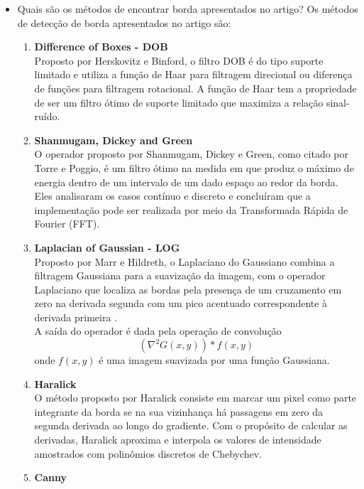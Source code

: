 \documentclass[12pt]{article}
\begin{document}
\begin{itemize}
\begin{itemize}
\item Quais são os métodos de encontrar borda apresentados no artigo?
Os métodos de detecção de borda apresentados no artigo são:
\begin{enumerate}[label*=\arabic*.]
    \item \textbf{Difference of Boxes - DOB}\\
    Proposto por Herskovitz e Binford, o filtro DOB é do tipo suporte limitado e utiliza a função de Haar para filtragem direcional
    ou diferença de funções para filtragem rotacional.
    A função de Haar tem a propriedade de ser um filtro ótimo de suporte limitado que maximiza a relação sinal-ruído.
    \\
    \item \textbf{Shanmugam, Dickey and Green}\\
    O operador proposto por Shanmugam, Dickey e Green, como citado por Torre e Poggio, é um filtro ótimo na medida em que produz
    o máximo de energia dentro de um intervalo de um dado espaço ao redor da borda. Eles analisaram os casos contínuo e discreto e
    concluíram que a implementação pode ser realizada por meio da Transformada Rápida de Fourier (FFT).
    \\
    \item \textbf{Laplacian of Gaussian - LOG}\\
    Proposto por Marr e Hildreth, o Laplaciano do Gaussiano combina a filtragem Gaussiana para a suavização da imagem, com o operador Laplaciano
    que localiza as bordas pela presença de um cruzamento em zero na derivada segunda com um pico acentuado correspondente à derivada primeira \cite{pedrini2008analise}.\\
    A saída do operador é dada pela operação de convolução
    \begin{equation} \label{eq:log}
        (\nabla^2 G(x, y)) * f(x, y)
    \end{equation}
    onde $f(x, y)$ é uma imagem suavizada por uma função Gaussiana.
    \\
    \item \textbf{Haralick}\\
    O método proposto por Haralick consiste em marcar um pixel como parte integrante da borda se na sua vizinhança há passagens em zero da segunda 
    derivada ao longo do gradiente. Com o propósito de calcular as derivadas, Haralick aproxima e interpola os valores de intensidade amostrados
    com polinômios discretos de Chebychev.
    \\
    \item \textbf{Canny}\\

\end{enumerate}
\end{itemize}
\end{itemize}
\end{document}
